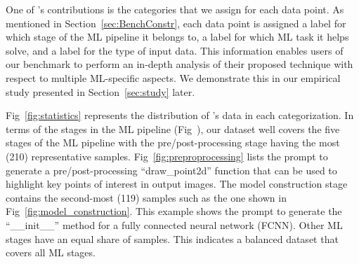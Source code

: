 One of \tool's contributions is the categories that we assign for each data point. As mentioned in Section~\ref{sec:BenchConstr}, each data point is assigned a label for which stage of the ML pipeline it belongs to, a label for which ML task it helps solve, and a label for the type of input data. This information enables users of our benchmark to perform an in-depth analysis of their proposed technique with respect to multiple ML-specific aspects. We demonstrate this in our empirical study presented in Section~\ref{sec:study} later.




Fig~\ref{fig:statistics} represents the distribution of \tool's data in each categorization. In terms of the stages in the ML pipeline (Fig~), our dataset well covers the five stages of the ML pipeline with the pre/post-processing stage having the most (210) representative samples. Fig~\ref{fig:preproprocessing} lists the prompt to generate 
a pre/post-processing ``draw\_point2d'' function that can be used to 
highlight key points of interest in output images. The model construction stage contains the second-most (119) samples such as the one shown in Fig~\ref{fig:model_construction}. This example shows the prompt to generate the
``\_\_init\_\_'' method for a fully connected neural network (FCNN). Other ML stages have an equal share of samples. This indicates a balanced dataset that covers all ML stages.

